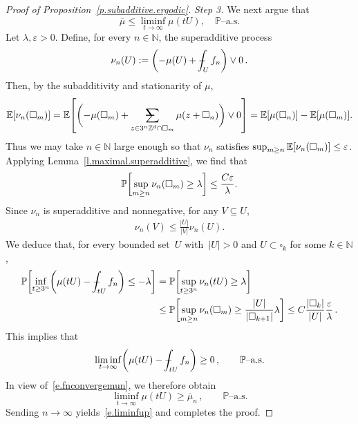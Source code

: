 \documentclass[11pt]{article} %
\makeatletter
\let\oldsquare\square %
\renewcommand{\square}{\oldsquare}
\numberwithin{equation}{section}
\theoremstyle{definition}
\let\originalleft\left
\let\originalright\right
\renewcommand{\left}{\mathopen{}\mathclose\bgroup\originalleft}
\renewcommand{\right}{\aftergroup\egroup\originalright}
\newcommand*{\N}{\ensuremath{\mathbb{N}}}
\newcommand*{\Z}{\ensuremath{\mathbb{Z}}}
\newcommand{\eps}{\varepsilon}
\newcommand{\ep}{\eps}
\newcommand{\cu}{\square}
\renewcommand{\P}{\mathbb{P}}
\newcommand{\E}{\mathbb{E}}
\newcommand{\avsum}{\mathop{\mathpalette\avsuminner\relax}\displaylimits}
\newcommand\avsuminner[2]{%
  {\sbox0{$\m@th#1\sum$}%
   \vphantom{\usebox0}%
   \ooalign{%
     \hidewidth
     \smash{\,\rule[.23em]{8.8pt}{1.1pt} \relax}%
     \hidewidth\cr
     $\m@th#1\sum$\cr
   }%
  }%
}
\def\Xint#1{\mathchoice
{\XXint\displaystyle\textstyle{#1}}%
{\XXint\textstyle\scriptstyle{#1}}%
{\XXint\scriptstyle\scriptscriptstyle{#1}}%
{\XXint\scriptscriptstyle\scriptscriptstyle{#1}}%
\!\int}
\def\XXint#1#2#3{{\setbox0=\hbox{$#1{#2#3}{\int}$}
\vcenter{\hbox{$#2#3$}}\kern-.5\wd0}}
\def\fint{\Xint-}
\makeatother
\begin{document}
\begin{proof}[{Proof of Proposition~\ref{p.subadditive.ergodic}}]
\emph{Step 3.}
We next argue that 
\begin{equation}
\label{e.liminfup}
\overline{\mu}
\leq 
\liminf_{t\to \infty} \mu(t U) , 
\quad \mbox{$\P$--a.s.}
\end{equation}
Let $\lambda,\ep>0$. Define, for every $n \in \N$, the superadditive process
\begin{equation*}
\nu_n(U):= \biggl( - \mu(U) + \fint_U f_n \biggr) \vee 0 \,.
\end{equation*}
Then, by the subadditivity and stationarity of $\mu$, 
\begin{align*}  
\E \left[ \nu_n(\cu_m) \right] = \E \left[ \biggl(  - \mu(\cu_m) + \avsum_{z \in 3^n \Z^d \cap \cu_m} \mu(z+\cu_n)
\biggr) \vee 0 \right] = \E \left[\mu(\cu_n)\right] -  \E \left[\mu(\cu_m)\right]  .
\end{align*}
Thus we may take $n\in\N$ large enough so that $\nu_n$ satisfies $\sup_{m\geq n}\E \left[ \nu_n(\cu_m) \right] \leq \ep$. 
Applying Lemma~\ref{l.maximal.superadditive}, we find that 
\begin{equation*}
\P \left[ 
\sup_{m\geq n} \nu_n (\cu_m) \geq \lambda
\right] 
\leq 
\frac{C \ep}{\lambda}. 
\end{equation*}
Since $\nu_n$ is superadditive and nonnegative, for any $V \subseteq U$, 
\begin{align*}
\nu_n(V) \leq \frac{|U|}{|V|} \nu_n(U). 
\end{align*}
We deduce that, for every bounded set~$U$ with~$|U|>0$ and $U \subset \cu_k$ for some $k \in \N$, 
\begin{align*}
\P \left[ 
\inf_{t\geq 3^n} \left( \mu(tU) - \fint_{tU} f_n \right) \leq - \lambda
\right] 
& =
\P \left[ 
\sup_{t\geq 3^n} \nu_n(tU) \geq \lambda
\right] 
\\ & \leq 
\P \left[ 
\sup_{m\geq n} \nu_n(\cu_m) \geq \frac{|U|}{|\cu_{k+1}|} \lambda
\right] 
\leq
C \frac{|\cu_k|}{|U|} \frac{\ep}{\lambda}\,.
\end{align*}
This implies that
\begin{equation*}
\liminf_{t\to \infty} 
\left( \mu(tU) - \fint_{tU} f_n \right)
\geq 0\,,\qquad \mbox{$\P$--a.s.}
\end{equation*}
In view of~\eqref{e.fnconvergemun}, we therefore obtain
\begin{equation*}
\liminf_{t\to \infty} \mu(tU) 
\geq \overline{\mu}_n\,,\qquad \mbox{$\P$--a.s.}
\end{equation*}
Sending $n\to \infty$ yields~\eqref{e.liminfup} and completes the proof. 
\end{proof}
\end{document}
